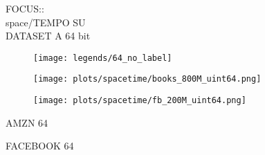 \documentclass{article}
\begin{document}
\begin{figure}[!htbp]
\fbox
{
\begin{minipage}[t][0.98\textheight][t]{\textwidth}
\centering
    \begin{minipage}{0.23\linewidth}
    \footnotesize{FOCUS::\\ space/TEMPO SU \\ DATASET A 64 bit}
    \end{minipage}
   \begin{minipage}{0.75\linewidth}
        \begin{figure}[H]
        \texttt{[image: legends/64\_no\_label]}
        \end{figure}
    \end{minipage}
    \vfill 

   \begin{minipage}{0.48\linewidth}
        \begin{figure}[H]
        \texttt{[image: plots/spacetime/books\_800M\_uint64.png]}
        \end{figure}
    \end{minipage}
    \begin{minipage}{0.48\linewidth}
        \begin{figure}[H]
        \texttt{[image: plots/spacetime/fb\_200M\_uint64.png]} 
        \end{figure}
    \end{minipage}
    \begin{minipage}{0.48\linewidth}
    \begin{center}
        AMZN 64
    \end{center}
    \end{minipage}
    \begin{minipage}{0.48\linewidth}
    \begin{center}
        FACEBOOK 64
    \end{center}
    \end{minipage}

    \vfill


\end{minipage}}
\end{figure}
\end{document}

